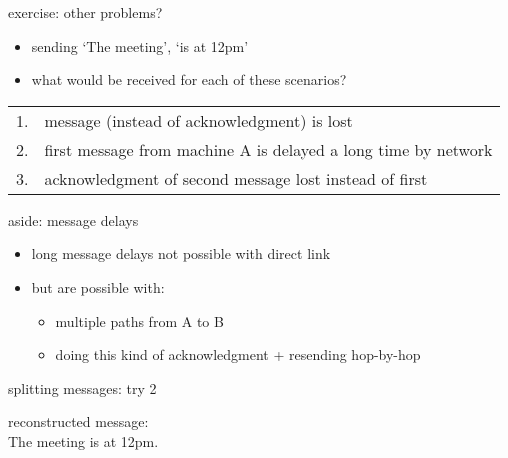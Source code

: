 \begin{frame}{exercise: other problems?}
\begin{itemize}
\item sending `The meeting', `is at 12pm'
\item what would be received for each of these scenarios?
\end{itemize}
\begin{tabular}{ll}
1. & message (instead of acknowledgment) is lost \\
2. & first message from machine A is delayed a long time by network \\
3. & acknowledgment of second message lost instead of first \\
\end{tabular}
\end{frame}

\begin{frame}{aside: message delays}
    \begin{itemize}
    \item long message delays not possible with direct link
    \vspace{.5cm}
    \item but are possible with:
        \begin{itemize}
        \item multiple paths from A to B
        \item doing this kind of acknowledgment + resending hop-by-hop
        \end{itemize}
    \end{itemize}
\end{frame}

\begin{frame}{splitting messages: try 2}
reconstructed message: \\
The meeting is at 12pm.
\end{frame}

